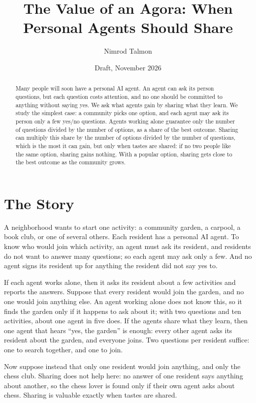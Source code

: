 \documentclass[11pt]{article}
\title{The Value of an Agora: When Personal Agents Should Share}
\author{Nimrod Talmon}
\date{Draft, November 2026}
\theoremstyle{definition}
\begin{document}
\maketitle

\begin{abstract}
Many people will soon have a personal AI agent. An agent can ask its person questions, but each question costs attention, and no one should be committed to anything without saying yes. We ask what agents gain by sharing what they learn. We study the simplest case: a community picks one option, and each agent may ask its person only a few yes/no questions. Agents working alone guarantee only the number of questions divided by the number of options, as a share of the best outcome. Sharing can multiply this share by the number of options divided by the number of questions, which is the most it can gain, but only when tastes are shared: if no two people like the same option, sharing gains nothing. With a popular option, sharing gets close to the best outcome as the community grows.
\end{abstract}

\section{The Story}

A neighborhood wants to start one activity: a community garden, a carpool, a book club, or one of several others.
Each resident has a personal AI agent.
To know who would join which activity, an agent must ask its resident, and residents do not want to answer many questions; so each agent may ask only a few.
And no agent signs its resident up for anything the resident did not say yes to.

If each agent works alone, then it asks its resident about a few activities and reports the answers.
Suppose that every resident would join the garden, and no one would join anything else.
An agent working alone does not know this, so it finds the garden only if it happens to ask about it; with two questions and ten activities, about one agent in five does.
If the agents share what they learn, then one agent that hears ``yes, the garden'' is enough: every other agent asks its resident about the garden, and everyone joins.
Two questions per resident suffice: one to search together, and one to join.

Now suppose instead that only one resident would join anything, and only the chess club.
Sharing does not help here: no answer of one resident says anything about another, so the chess lover is found only if their own agent asks about chess.
Sharing is valuable exactly when tastes are shared.
\end{document}
